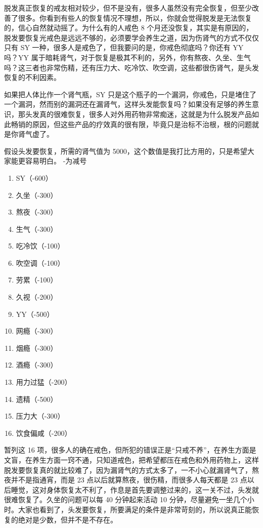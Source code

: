\documentclass[fontset=founder]{ctexart}
\begin{document}
脱发真正恢复的戒友相对较少，但不是没有，很多人虽然没有完全恢复，但至少改善了很多。你看到有些人的恢复情况不理想，所以，你就会觉得脱发是无法恢复的，信心自然就动摇了。为什么有的人戒色 8 个月还没恢复，其实是有原因的，脱发要恢复光戒色是远远不够的，必须要学会养生之道，因为伤肾气的方式不仅仅只有 SY 一种，很多人是戒色了，但我要问的是，你戒色彻底吗？你还有 YY 吗？YY 属于暗耗肾气，对于恢复是极其不利的，另外，你有熬夜、久坐、生气吗？这三者也非常伤精，还有压力大、吃冷饮、吹空调，这些都很伤肾气，是头发恢复的不利因素。

如果把人体比作一个肾气瓶，SY 只是这个瓶子的一个漏洞，你戒色，只是堵住了一个漏洞，然而别的漏洞还在漏肾气，这样头发能恢复吗？如果没有足够的养生意识，那头发真的很难恢复，很多人对外用药物非常痴迷，这就是为什么脱发产品如此畅销的原因，但这些产品的疗效真的很有限，毕竟只是治标不治根，根的问题就是你肾气虚了。

假设头发要恢复，所需的肾气值为 5000，这个数值是我打比方用的，只是希望大家能更容易明白。
-为减号

\begin{enumerate}
    \item SY（-600）
    \item 久坐（-300）
    \item 熬夜（-300）
    \item 生气（-300）
    \item 吃冷饮（-100）
    \item 吹空调（-100）
    \item 劳累（-100）
    \item 久视（-200）
    \item YY（-500）
    \item 网瘾（-300）
    \item 烟瘾（-300）
    \item 酒瘾（-300）
    \item 用力过猛（-200）
    \item 遗精（-500）
    \item 压力大（-300）
    \item 饮食偏咸（-200）
\end{enumerate}

暂列这 16 项，很多人的确在戒色，但所犯的错误正是“只戒不养”，在养生方面是文盲，在养生方面一窍不通，只知道戒色，把希望都压在戒色和外用药物上，这样脱发要恢复真的就比较难了，因为漏肾气的方式太多了，一不小心就漏肾气了，熬夜并不是指通宵，而是 23 点以后就算熬夜，很伤精，而很多人每天都是 23 点以后睡觉，这对身体恢复太不利了，作息是首先要调整过来的，这一关不过，头发就很难恢复了。久坐的问题可以每 40 分钟起来活动 10 分钟，尽量避免一坐几个小时。大家也看到了，头发要恢复，所要满足的条件是非常苛刻的，所以说真正能恢复的绝对是少数，但并不是不存在。
\end{document}
